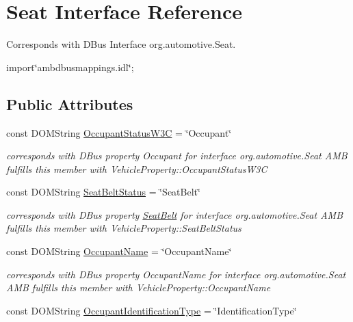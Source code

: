 \hypertarget{interfaceSeat}{\section{Seat Interface Reference}
\label{interfaceSeat}
}


Corresponds with D\+Bus Interface org.\+automotive.\+Seat.  




{\ttfamily import\char`\"{}ambdbusmappings.\+idl\char`\"{};}

\subsection*{Public Attributes}
\begin{DoxyCompactItemize}
\item 
\hypertarget{interfaceSeat_a9dfd71204222c0d59de76716120bff44}{const D\+O\+M\+String \hyperlink{interfaceSeat_a9dfd71204222c0d59de76716120bff44}{Occupant\+Status\+W3\+C} = \char`\"{}Occupant\char`\"{}}\label{interfaceSeat_a9dfd71204222c0d59de76716120bff44}

\begin{DoxyCompactList}\small\item\em corresponds with D\+Bus property Occupant for interface org.\+automotive.\+Seat A\+M\+B fulfills this member with Vehicle\+Property\+::\+Occupant\+Status\+W3\+C \end{DoxyCompactList}\item 
\hypertarget{interfaceSeat_a4ad0b531d1d20e3490f67ff56792a701}{const D\+O\+M\+String \hyperlink{interfaceSeat_a4ad0b531d1d20e3490f67ff56792a701}{Seat\+Belt\+Status} = \char`\"{}Seat\+Belt\char`\"{}}\label{interfaceSeat_a4ad0b531d1d20e3490f67ff56792a701}

\begin{DoxyCompactList}\small\item\em corresponds with D\+Bus property \hyperlink{interfaceSeatBelt}{Seat\+Belt} for interface org.\+automotive.\+Seat A\+M\+B fulfills this member with Vehicle\+Property\+::\+Seat\+Belt\+Status \end{DoxyCompactList}\item 
\hypertarget{interfaceSeat_afa5739cd2f418bbc28fa6a469706c8fa}{const D\+O\+M\+String \hyperlink{interfaceSeat_afa5739cd2f418bbc28fa6a469706c8fa}{Occupant\+Name} = \char`\"{}Occupant\+Name\char`\"{}}\label{interfaceSeat_afa5739cd2f418bbc28fa6a469706c8fa}

\begin{DoxyCompactList}\small\item\em corresponds with D\+Bus property Occupant\+Name for interface org.\+automotive.\+Seat A\+M\+B fulfills this member with Vehicle\+Property\+::\+Occupant\+Name \end{DoxyCompactList}\item 
\hypertarget{interfaceSeat_aac8ae80e32ed167cfd9275692fb0cee1}{const D\+O\+M\+String \hyperlink{interfaceSeat_aac8ae80e32ed167cfd9275692fb0cee1}{Occupant\+Identification\+Type} = \char`\"{}Identification\+Type\char`\"{}}\label{interfaceSeat_aac8ae80e32ed167cfd9275692fb0cee1}


\end{DoxyCompactItemize}
